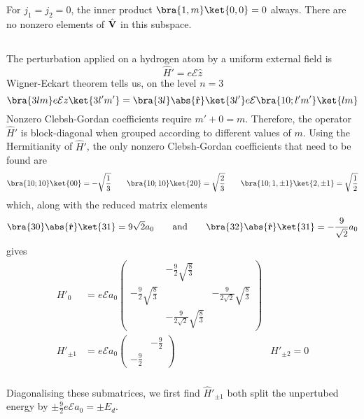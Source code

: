 \documentclass[12pt]{article}
\begin{document}
        \subsubsection{} For \(j_1 = j_2 = 0\), the inner product \(\bra{1,m} \ket{0,0} = 0\) always. There are no nonzero elements of \(\hat{\bf V}\) in this subspace.
        \subsection{} 
        \subsubsection{} The perturbation applied on a hydrogen atom by a uniform external field is \[
            \hat{H}' = e \mathcal{E} \hat{z}
        \]
        Wigner-Eckart theorem tells us, on the level \(n = 3\) \[
            \bra{3lm} e\mathcal{E} z \ket{3l'm'} = \bra{3l} \abs{\hat{\bf r}} \ket{3l'} e \mathcal{E} \bra{10;l'm'} \ket{lm}
        \]
        Nonzero Clebsh-Gordan coefficients require \(m' + 0 = m\). Therefore, the operator \(\hat{H}'\) is block-diagonal when grouped according to different values of \(m\). Using the Hermitianity of \(\hat{H}'\), the only nonzero Clebsh-Gordan coefficients that need to be found are \begin{align*}
            \bra{10;10} \ket{00} = - \sqrt{\frac{1}{3}} \qquad\bra{10;10} \ket{20} = \sqrt{\frac{2}{3}}\qquad\bra{10;1,\pm 1} \ket{2,\pm 1} = \sqrt{\frac{1}{2}}
        \end{align*}
        which, along with the reduced matrix elements \[\bra{30}\abs{\hat{\bf r}} \ket{31} = 9 \sqrt{2} a_0\qquad\text{and}\qquad\bra{32}\abs{\hat{\bf r}} \ket{31} =- \frac{9}{\sqrt{2}}a_0\] gives \begin{align*}
            H'_0 &= e\mathcal{E}a_0 \begin{pmatrix} &- \frac{9}{2} \sqrt{\frac{8}{3}}&\\ - \frac{9}{2} \sqrt{\frac{8}{3}}&&- \frac{9}{2 \sqrt{2}} \sqrt{\frac{8}{3}}\\& - \frac{9}{2 \sqrt{2}} \sqrt{\frac{8}{3}} \end{pmatrix}\\
            H'_{\pm 1} &= e\mathcal{E}a_0 \begin{pmatrix} &- \frac{9}{2}\\ - \frac{9}{2}&\end{pmatrix}& H'_{\pm 2} = 0
        \end{align*}
        \subsubsection{} Diagonalising these submatrices, we first find \(\hat{H}'_{\pm 1}\) both split the unpertubed energy by \(\pm \frac{9}{2} e \mathcal{E}a_0 =\pm E_d\). 
\end{document}
